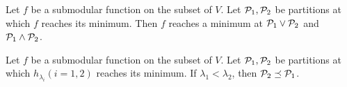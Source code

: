 \begin{theorem}\label{thm:lattice}
Let $f$ be a submodular function on the subset of $V$. Let $\P_1, \P_2$ be partitions
at which $f$ reaches its minimum. Then $f$ reaches a minimum at $\P_1 \vee \P_2$ and $\P_1 \wedge \P_2$.
\end{theorem}

\begin{theorem}\label{thm:hierarchical}
Let $f$ be a submodular function on the subset of $V$. Let $\P_1, \P_2$ be partitions
at which $h_{\lambda_i}(i=1,2)$ reaches its minimum. 
If $\lambda_1 < \lambda_2$, then $\P_2 \preceq \P_1$.
\end{theorem}